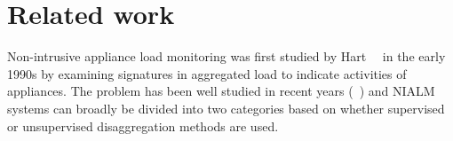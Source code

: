 \documentclass[conference]{IEEEtran}
\begin{document}
\section{Related work}
\noindent Non-intrusive appliance load monitoring was first studied by Hart~~\cite{hart} in the early 1990s by examining signatures in aggregated load to indicate activities of appliances. The problem has been well studied in recent years (~\cite{survey1,survey2,survey3}) and NIALM systems can broadly be divided into two categories based on whether supervised or unsupervised disaggregation methods are used.
\end{document}
